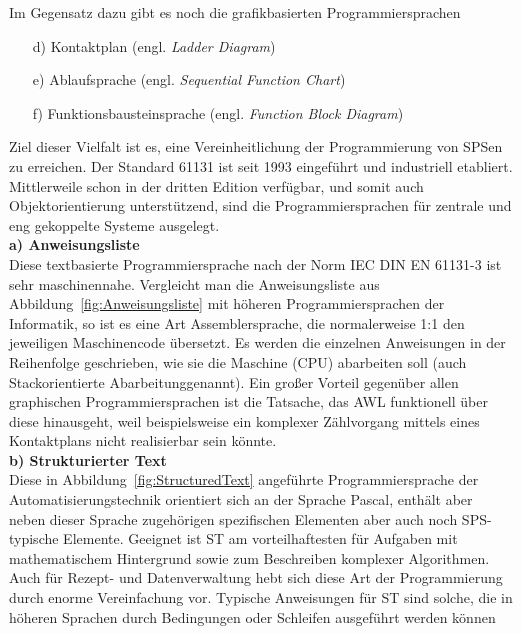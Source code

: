 	Im Gegensatz dazu gibt es noch die grafikbasierten Programmiersprachen
	
	\begin{itemize}
		\item[d)] Kontaktplan (engl. \textit{Ladder Diagram})
		\item[e)] Ablaufsprache (engl. \textit{Sequential Function Chart})
		\item[f)] Funktionsbausteinsprache (engl. \textit{Function Block Diagram})
	\end{itemize}
	
	Ziel dieser Vielfalt ist es, eine Vereinheitlichung der Programmierung von SPSen zu erreichen. Der Standard 61131 ist seit 1993 eingeführt und industriell etabliert. Mittlerweile schon in der dritten Edition verfügbar, und somit auch Objektorientierung unterstützend, sind die Programmiersprachen für zentrale und eng gekoppelte Systeme ausgelegt.\\
	
	\textbf{a) Anweisungsliste}\\
	
	Diese textbasierte Programmiersprache nach der Norm IEC DIN EN 61131-3 ist sehr maschinennahe. Vergleicht man die Anweisungsliste aus Abbildung~\ref{fig:Anweisungsliste} mit höheren Programmiersprachen der Informatik, so ist es eine Art Assemblersprache, die normalerweise 1:1 den jeweiligen Maschinencode übersetzt. Es werden die einzelnen Anweisungen in der Reihenfolge geschrieben, wie sie die Maschine (CPU) abarbeiten soll (auch \glqq Stackorientierte Abarbeitung\grqq \space genannt). Ein großer Vorteil gegenüber allen graphischen Programmiersprachen ist die Tatsache, das AWL funktionell über diese hinausgeht, weil beispielsweise ein komplexer Zählvorgang mittels eines Kontaktplans nicht realisierbar sein könnte.	\cite{spslehrgang_struktur, egroetsch_sps}\\

	

	\textbf{b) Strukturierter Text}\\	
	Diese in Abbildung~\ref{fig:StructuredText} angeführte Programmiersprache der Automatisierungstechnik orientiert sich an der Sprache Pascal, enthält aber neben dieser Sprache zugehörigen spezifischen Elementen aber auch noch SPS-typische Elemente. Geeignet ist ST am vorteilhaftesten für Aufgaben mit mathematischem Hintergrund sowie zum Beschreiben komplexer Algorithmen. Auch für Rezept- und Datenverwaltung hebt sich diese Art der Programmierung durch enorme Vereinfachung vor. Typische Anweisungen für ST sind solche, die in höheren Sprachen durch Bedingungen oder Schleifen ausgeführt werden können \cite{grundlagen_automatisierungstechnik}
	
